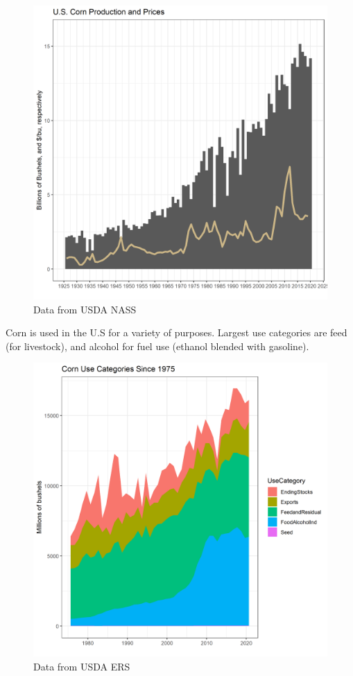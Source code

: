 \documentclass[
]{book}
\begin{document}
\begin{figure}
\centering
\includegraphics{assets/PrimerforGrain_CornProdand$.png}
\caption{Data from USDA NASS}
\end{figure}

Corn is used in the U.S for a variety of purposes. Largest use categories are feed (for livestock), and alcohol for fuel use (ethanol blended with gasoline).

\begin{figure}
\centering
\includegraphics{assets/PrimerforGrain_CornUse.png}
\caption{Data from USDA ERS}
\end{figure}
\end{document}
